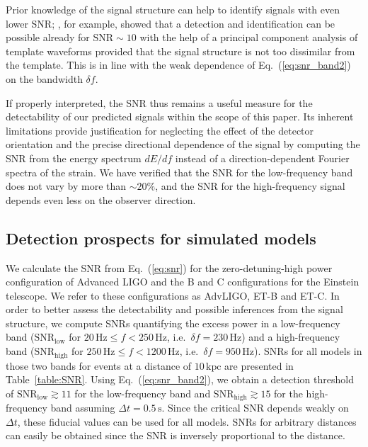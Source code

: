 Prior knowledge of the signal structure
can help to identify signals  with even lower SNR; \citet{logue_12},
for example, showed that a detection and identification can be
possible already for $\mathrm{SNR} \sim 10$ with the help of a
principal component analysis of template waveforms provided that the
signal structure is not too dissimilar from the template. This is
in line with the weak dependence of Eq.~(\ref{eq:snr_band2})
on the bandwidth $\delta f$.

If properly interpreted, the SNR thus remains a useful measure for the
detectability of our predicted signals within the scope of this paper.
Its inherent limitations provide justification for neglecting the
effect of the detector orientation and the
precise directional dependence of the signal by computing the SNR from
the energy spectrum $d E/df$ instead of a direction-dependent Fourier
spectra of the strain. We have verified that the SNR for
the low-frequency band does not vary by more than $\mathord{\sim} 20\%$,
and the SNR for the high-frequency signal depends even less on the
observer direction.

\subsection{Detection prospects for simulated models}
We calculate the SNR from Eq.~(\ref{eq:snr}) for the zero-detuning-high power configuration
of Advanced LIGO \citep{adv_sens} and the B \citep{et_b} and C \citep{et_c} configurations for the Einstein
telescope. We refer to these configurations as AdvLIGO, ET-B
and ET-C. In order to better assess the detectability and possible
inferences from the signal structure, we compute SNRs quantifying the
excess power in a low-frequency band ($\mathrm{SNR}_\mathrm{low}$ for
$20 \, \mathrm{Hz} \le f < 250 \, \mathrm{Hz}$,
i.e.\ $\delta f= 230 \, \mathrm{Hz}$) and a high-frequency
band ($\mathrm{SNR}_\mathrm{high}$ for $250 \, \mathrm{Hz} \le f <
1200 \, \mathrm{Hz}$, i.e.\ $\delta f= 950 \, \mathrm{Hz}$). SNRs for all models in
those two bands for events at a distance of $10 \, \mathrm{kpc}$ are
presented in Table~\ref{table:SNR}. Using
Eq.~(\ref{eq:snr_band2}), we obtain a detection threshold of
$\mathrm{SNR}_{\mathrm{low}} \gtrsim 11$ for the low-frequency band and
$\mathrm{SNR}_{\mathrm{high}} \gtrsim 15$ for the high-frequency band assuming
$\Delta t=0.5 \, \mathrm{s}$. Since the critical SNR depends
weakly on $\Delta t$, these fiducial values can be used for all
models. SNRs for arbitrary distances can easily be obtained since the
SNR is inversely proportional to the distance.

